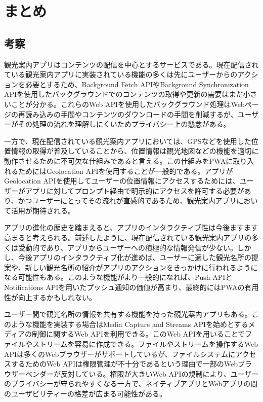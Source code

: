 \section{まとめ}
\label{section:まとめ}
\subsection{考察}
\label{subsection:考察}
観光案内アプリはコンテンツの配信を中心とするサービスである。現在配信されている観光案内アプリに実装されている機能の多くは先にユーザーからのアクションを必要とするため、Background Fetch APIやBackground Synchronization APIを使用したバックグラウンドでのコンテンツの取得や更新の需要はまだ小さいことが分かる。これらのWeb APIを使用したバックグラウンド処理はWebページの再読み込みの手間やコンテンツのダウンロードの手間を削減するが、ユーザーがその処理の流れを理解しにくいためプライバシー上の懸念がある。

一方で、現在配信されている観光案内アプリにおいては、GPSなどを使用した位置情報の取得が普及していることから、位置情報は観光地図などの機能を適切に動作させるために不可欠な仕組みであると言える。この仕組みをPWAに取り入れるためにはGeolocation APIを使用することが一般的である。アプリがGeolocation APIを使用してユーザーの位置情報にアクセスするためには、ユーザーがアプリに対してプロンプト経由で明示的にアクセスを許可する必要があり、かつユーザーにとってその流れが直感的であるため、観光案内アプリにおいて活用が期待される。

アプリの進化の歴史を踏まえると、アプリのインタラクティブ性は今後ますます高まると考えられる。前述したように、現在配信されている観光案内アプリの多くは受動的であり、アプリからユーザーへの積極的な情報発信が少ない。しかし、今後アプリのインタラクティブ化が進めば、ユーザーに適した観光名所の提案や、新しい観光名所の紹介がアプリのアクションをきっかけに行われるようになる可能性もある。このような機能がより一般的になれば、Push APIとNotifications APIを用いたプッシュ通知の価値が高まり、最終的にはPWAの有用性が向上するかもしれない。

ユーザー間で観光名所の情報を共有する機能を持った観光案内アプリもある。このような機能を実装する場合はMedia Capture and Streams APIを始めとするメディアの制御に関するWeb APIを利用できる。このWeb APIを用いることでファイルやストリームを容易に作成できる。ファイルやストリームを操作するWeb APIは多くのWebブラウザーがサポートしているが、ファイルシステムにアクセスするためのWeb APIは権限管理が不十分であるという理由で一部のWebブラウザーベンダーが反対している。権限が大きいWeb APIの規制により、ユーザーのプライバシーが守られやすくなる一方で、ネイティブアプリとWebアプリの間のユーザビリティーの格差が広まる可能性がある。

